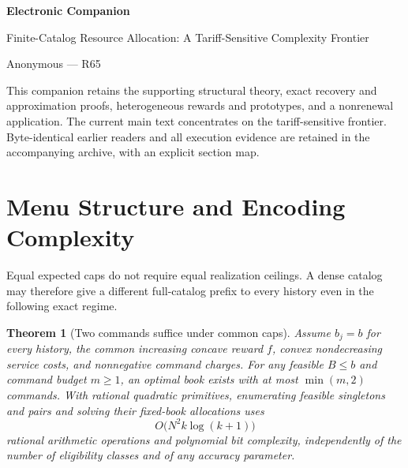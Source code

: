 \documentclass[11pt,letterpaper]{article}
\newtheorem{theorem}{Theorem}[section]
\theoremstyle{definition}\newtheorem{remark}[theorem]{Remark}
\begin{document}
\begin{center}{\Large\bfseries Electronic Companion}\par Finite-Catalog Resource Allocation: A Tariff-Sensitive Complexity Frontier\par Anonymous --- R65\end{center}
This companion retains the supporting structural theory, exact recovery and approximation proofs, heterogeneous rewards and prototypes, and a nonrenewal application. The current main text concentrates on the tariff-sensitive frontier. Byte-identical earlier readers and all execution evidence are retained in the accompanying archive, with an explicit section map.
\section{Menu Structure and Encoding Complexity}\label{sec:caps54}
Equal expected caps do not require equal realization ceilings. A dense catalog may therefore give a different full-catalog prefix to every history even in the following exact regime.
\begin{theorem}[Two commands suffice under common caps]\label{thm:twocommand54}
Assume $b_j=b$ for every history, the common increasing concave reward $f$, convex nondecreasing service costs, and nonnegative command charges. For any feasible $B\leq b$ and command budget $m\geq1$, an optimal book exists with at most $\min(m,2)$ commands. With rational quadratic primitives, enumerating feasible singletons and pairs and solving their fixed-book allocations uses
\[
 O\bigl(N^2k\log(k+1)\bigr)
\]
rational arithmetic operations and polynomial bit complexity, independently of the number of eligibility classes and of any accuracy parameter.
\end{theorem}
\end{document}
